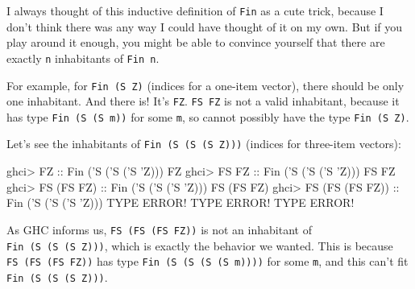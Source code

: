 \documentclass[]{article}
\newenvironment{Shaded}{}{}
\newcommand{\DataTypeTok}[1]{\textcolor[rgb]{0.56,0.13,0.00}{#1}}
\newcommand{\CharTok}[1]{\textcolor[rgb]{0.25,0.44,0.63}{#1}}
\newcommand{\OtherTok}[1]{\textcolor[rgb]{0.00,0.44,0.13}{#1}}
\newcommand{\FunctionTok}[1]{\textcolor[rgb]{0.02,0.16,0.49}{#1}}
\newcommand{\NormalTok}[1]{#1}
\begin{document}
I always thought of this inductive definition of \texttt{Fin} as a cute trick,
because I don't think there was any way I could have thought of it on my own.
But if you play around it enough, you might be able to convince yourself that
there are exactly \texttt{n} inhabitants of \texttt{Fin\ n}.

For example, for \texttt{Fin\ (\textquotesingle{}S\ \textquotesingle{}Z)}
(indices for a one-item vector), there should be only one inhabitant. And there
is! It's \texttt{FZ}. \texttt{FS\ FZ} is not a valid inhabitant, because it has
type \texttt{Fin\ (\textquotesingle{}S\ (\textquotesingle{}S\ m))} for some
\texttt{m}, so cannot possibly have the type
\texttt{Fin\ (\textquotesingle{}S\ \textquotesingle{}Z)}.

Let's see the inhabitants of
\texttt{Fin\ (\textquotesingle{}S\ (\textquotesingle{}S\ (\textquotesingle{}S\ \textquotesingle{}Z)))}
(indices for three-item vectors):

\begin{Shaded}
\begin{Highlighting}[]
\NormalTok{ghci}\FunctionTok{>} \DataTypeTok{FZ}\OtherTok{              ::} \DataTypeTok{Fin}\NormalTok{ (}\CharTok{'S ('}\DataTypeTok{S}\NormalTok{ (}\CharTok{'S '}\DataTypeTok{Z}\NormalTok{)))}
\DataTypeTok{FZ}
\NormalTok{ghci}\FunctionTok{>} \DataTypeTok{FS} \DataTypeTok{FZ}\OtherTok{           ::} \DataTypeTok{Fin}\NormalTok{ (}\CharTok{'S ('}\DataTypeTok{S}\NormalTok{ (}\CharTok{'S '}\DataTypeTok{Z}\NormalTok{)))}
\DataTypeTok{FS} \DataTypeTok{FZ}
\NormalTok{ghci}\FunctionTok{>} \DataTypeTok{FS}\NormalTok{ (}\DataTypeTok{FS} \DataTypeTok{FZ}\NormalTok{)}\OtherTok{      ::} \DataTypeTok{Fin}\NormalTok{ (}\CharTok{'S ('}\DataTypeTok{S}\NormalTok{ (}\CharTok{'S '}\DataTypeTok{Z}\NormalTok{)))}
\DataTypeTok{FS}\NormalTok{ (}\DataTypeTok{FS} \DataTypeTok{FZ}\NormalTok{)}
\NormalTok{ghci}\FunctionTok{>} \DataTypeTok{FS}\NormalTok{ (}\DataTypeTok{FS}\NormalTok{ (}\DataTypeTok{FS} \DataTypeTok{FZ}\NormalTok{))}\OtherTok{ ::} \DataTypeTok{Fin}\NormalTok{ (}\CharTok{'S ('}\DataTypeTok{S}\NormalTok{ (}\CharTok{'S '}\DataTypeTok{Z}\NormalTok{)))}
\DataTypeTok{TYPE} \DataTypeTok{ERROR}\FunctionTok{!}  \DataTypeTok{TYPE} \DataTypeTok{ERROR}\FunctionTok{!}  \DataTypeTok{TYPE} \DataTypeTok{ERROR}\FunctionTok{!}
\end{Highlighting}
\end{Shaded}

As GHC informs us, \texttt{FS\ (FS\ (FS\ FZ))} is not an inhabitant of
\texttt{Fin\ (\textquotesingle{}S\ (\textquotesingle{}S\ (\textquotesingle{}S\ \textquotesingle{}Z)))},
which is exactly the behavior we wanted. This is because
\texttt{FS\ (FS\ (FS\ FZ))} has type
\texttt{Fin\ (\textquotesingle{}S\ (\textquotesingle{}S\ (\textquotesingle{}S\ (\textquotesingle{}S\ m))))}
for some \texttt{m}, and this can't fit
\texttt{Fin\ (\textquotesingle{}S\ (\textquotesingle{}S\ (\textquotesingle{}S\ \textquotesingle{}Z)))}.
\end{document}
